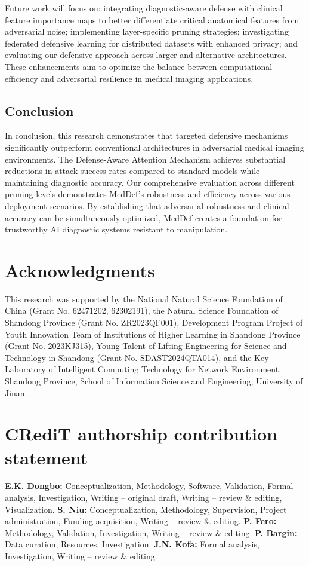 \documentclass[preprint,12pt]{elsarticle}
\begin{document}
Future work will focus on: integrating diagnostic-aware defense with clinical feature importance maps to better differentiate critical anatomical features from adversarial noise; implementing layer-specific pruning strategies; investigating federated defensive learning for distributed datasets with enhanced privacy; and evaluating our defensive approach across larger and alternative architectures. These enhancements aim to optimize the balance between computational efficiency and adversarial resilience in medical imaging applications.

\subsection{Conclusion}
In conclusion, this research demonstrates that targeted defensive mechanisms significantly outperform conventional architectures in adversarial medical imaging environments. The Defense-Aware Attention Mechanism achieves substantial reductions in attack success rates compared to standard models while maintaining diagnostic accuracy. Our comprehensive evaluation across different pruning levels demonstrates MedDef's robustness and efficiency across various deployment scenarios. By establishing that adversarial robustness and clinical accuracy can be simultaneously optimized, MedDef creates a foundation for trustworthy AI diagnostic systems resistant to manipulation.

\section*{Acknowledgments}
This research was supported by the National Natural Science Foundation of China (Grant No. 62471202, 62302191), the Natural Science Foundation of Shandong Province (Grant No. ZR2023QF001), Development Program Project of Youth Innovation Team of Institutions of Higher Learning in Shandong Province (Grant No. 2023KJ315), Young Talent of Lifting Engineering for Science and Technology in Shandong (Grant No. SDAST2024QTA014), and the Key Laboratory of Intelligent Computing Technology for Network Environment, Shandong Province, School of Information Science and Engineering, University of Jinan.

\section*{CRediT authorship contribution statement}
\textbf{E.K. Dongbo:} Conceptualization, Methodology, Software, Validation, Formal analysis, Investigation, Writing – original draft, Writing – review \& editing, Visualization.
\textbf{S. Niu:} Conceptualization, Methodology, Supervision, Project administration, Funding acquisition, Writing – review \& editing.
\textbf{P. Fero:} Methodology, Validation, Investigation, Writing – review \& editing.
\textbf{P. Bargin:} Data curation, Resources, Investigation.
\textbf{J.N. Kofa:} Formal analysis, Investigation, Writing – review \& editing.
\end{document}

